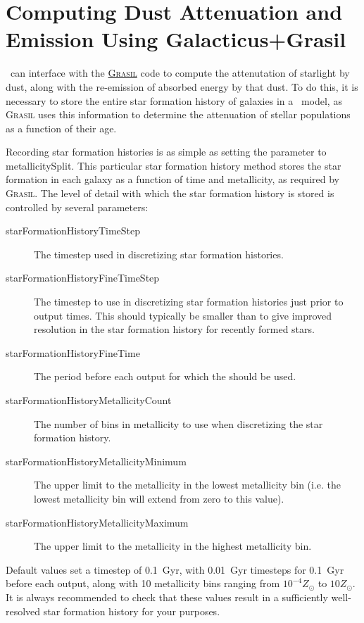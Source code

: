\section{Computing Dust Attenuation and Emission Using Galacticus+Grasil}\label{sec:TutorialGrasil}

\glc\ can interface with the \href{http://adlibitum.oat.ts.astro.it/silva/grasil/grasil.html}{\normalfont \scshape Grasil} code to compute the attenutation of starlight by dust, along with the re-emission of absorbed energy by that dust. To do this, it is necessary to store the entire star formation history of galaxies in a \glc\ model, as {\normalfont \scshape Grasil} uses this information to determine the attenuation of stellar populations as a function of their age.

Recording star formation histories is as simple as setting the {\normalfont \ttfamily [starFormationHistoriesMethod]} parameter to {\normalfont \ttfamily metallicitySplit}. This particular star formation history method stores the star formation in each galaxy as a function of time and metallicity, as required by {\normalfont \scshape Grasil}. The level of detail with which the star formation history is stored is controlled by several parameters:
\begin{description}
\item [{\normalfont \ttfamily starFormationHistoryTimeStep}] The timestep used in discretizing star formation histories.
\item [{\normalfont \ttfamily starFormationHistoryFineTimeStep}] The timestep to use in discretizing star formation histories just prior to output times. This should typically be smaller than {\normalfont \ttfamily [starFormationHistoryTimeStep]} to give improved resolution in the star formation history for recently formed stars.
\item [{\normalfont \ttfamily starFormationHistoryFineTime}] The period before each output for which the {\normalfont \ttfamily [starFormationHistoryFineTimeStep]} should be used.
\item [{\normalfont \ttfamily starFormationHistoryMetallicityCount}] The number of bins in metallicity to use when discretizing the star formation history.
\item [{\normalfont \ttfamily starFormationHistoryMetallicityMinimum}] The upper limit to the metallicity in the lowest metallicity bin (i.e. the lowest metallicity bin will extend from zero to this value).
\item [{\normalfont \ttfamily starFormationHistoryMetallicityMaximum}] The upper limit to the metallicity in the highest metallicity bin.
\end{description}
Default values set a timestep of 0.1~Gyr, with 0.01~Gyr timesteps for 0.1~Gyr before each output, along with 10 metallicity bins ranging from $10^{-4}Z_\odot$ to $10Z_\odot$. It is always recommended to check that these values result in a sufficiently well-resolved star formation history for your purposes.

